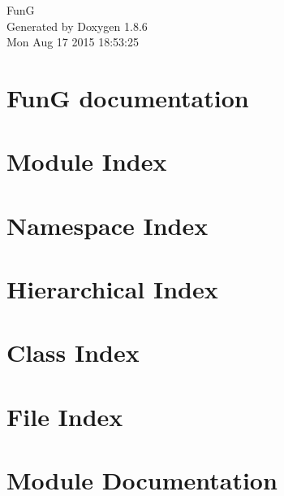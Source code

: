 \documentclass[twoside]{book}
\newcommand{\clearemptydoublepage}{%
  \newpage{\pagestyle{empty}\cleardoublepage}%
}
\begin{document}
\hypersetup{pageanchor=false}
\begin{titlepage}
\vspace*{7cm}
\begin{center}%
{\Large Fun\-G }\\
\vspace*{1cm}
{\large Generated by Doxygen 1.8.6}\\
\vspace*{0.5cm}
{\small Mon Aug 17 2015 18:53:25}\\
\end{center}
\end{titlepage}
\clearemptydoublepage
\tableofcontents
\clearemptydoublepage
{}
\hypersetup{pageanchor=true}

\chapter{Fun\-G documentation}
\label{index}\hypertarget{index}{}
\chapter{Module Index}

\chapter{Namespace Index}

\chapter{Hierarchical Index}

\chapter{Class Index}

\chapter{File Index}

\chapter{Module Documentation}













\end{document}
